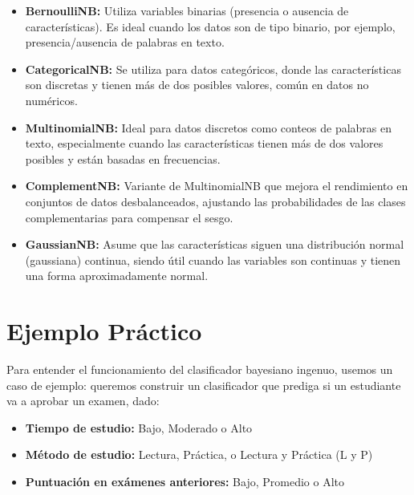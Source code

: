 \documentclass[12pt]{article}
\begin{document}
\begin{itemize}
    \item \textbf{BernoulliNB:} Utiliza variables binarias (presencia o ausencia de características). Es ideal cuando los datos son de tipo binario, por ejemplo, presencia/ausencia de palabras en texto.
    \item \textbf{CategoricalNB:} Se utiliza para datos categóricos, donde las características son discretas y tienen más de dos posibles valores, común en datos no numéricos.
    \item \textbf{MultinomialNB:} Ideal para datos discretos como conteos de palabras en texto, especialmente cuando las características tienen más de dos valores posibles y están basadas en frecuencias.
    \item \textbf{ComplementNB:} Variante de MultinomialNB que mejora el rendimiento en conjuntos de datos desbalanceados, ajustando las probabilidades de las clases complementarias para compensar el sesgo.
    \item \textbf{GaussianNB:} Asume que las características siguen una distribución normal (gaussiana) continua, siendo útil cuando las variables son continuas y tienen una forma aproximadamente normal.
\end{itemize}

\section{Ejemplo Práctico}
Para entender el funcionamiento del clasificador bayesiano ingenuo, usemos un caso de ejemplo: queremos construir un clasificador que prediga si un estudiante va a aprobar un examen, dado:

\begin{itemize}
    \item \textbf{Tiempo de estudio:} Bajo, Moderado o Alto
    \item \textbf{Método de estudio:} Lectura, Práctica, o Lectura y Práctica (L y P)
    \item \textbf{Puntuación en exámenes anteriores:} Bajo, Promedio o Alto
\end{itemize}
\end{document}

